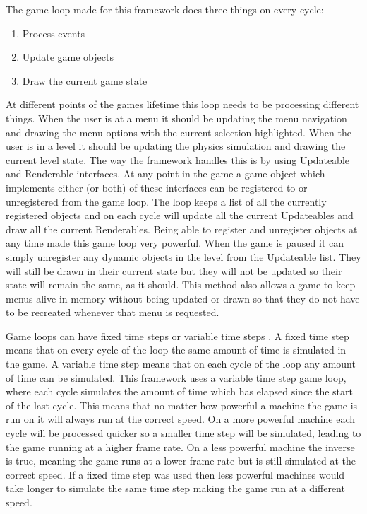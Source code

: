 \documentclass[]{report}
\begin{document}
			The game loop made for this framework does three things on every cycle:
			\begin{enumerate}
				\item Process events
				\item Update game objects
				\item Draw the current game state
			\end{enumerate}
			
			At different points of the games lifetime this loop needs to be processing different things. When the user is at a menu it should be updating the menu navigation and drawing the menu options with the current selection highlighted. When the user is in a level it should be updating the physics simulation and drawing the current level state. The way the framework handles this is by using Updateable and Renderable interfaces. At any point in the game a game object which implements either (or both) of these interfaces can be registered to or unregistered from the game loop. The loop keeps a list of all the currently registered objects and on each cycle will update all the current Updateables and draw all the current Renderables. Being able to register and unregister objects at any time made this game loop very powerful. When the game is paused it can simply unregister any dynamic objects in the level from the Updateable list. They will still be drawn in their current state but they will not be updated so their state will remain the same, as it should. This method also allows a game to keep menus alive in memory without being updated or drawn so that they do not have to be recreated whenever that menu is requested.
			
			Game loops can have fixed time steps or variable time steps \cite{gamepatterns}. A fixed time step means that on every cycle of the loop the same amount of time is simulated in the game. A variable time step means that on each cycle of the loop any amount of time can be simulated. This framework uses a variable time step game loop, where each cycle simulates the amount of time which has elapsed since the start of the last cycle. This means that no matter how powerful a machine the game is run on it will always run at the correct speed. On a more powerful machine each cycle will be processed quicker so a smaller time step will be simulated, leading to the game running at a higher frame rate. On a less powerful machine the inverse is true, meaning the game runs at a lower frame rate but is still simulated at the correct speed. If a fixed time step was used then less powerful machines would take longer to simulate the same time step making the game run at a different speed.
			
\end{document}
